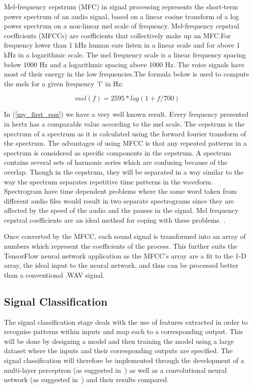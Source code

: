 \documentclass[10pt,twocolumn]{witseiepaper}
\begin{document}
Mel-frequency cepstrum (MFC) in signal processing represents the short-term power spectrum of an audio signal, based on a linear cosine transform of a log power spectrum on a non-linear mel scale of frequency. Mel-frequency cepstral coefficients (MFCCs) are coefficients that collectively make up an MFC.For frequency lower than 1 kHz human ears listen in a linear scale and for above 1 kHz in a logarithmic scale. The mel frequency scale is a linear frequency spacing below 1000 Hz and a logarithmic spacing above 1000 Hz. The voice signals have most of their energy in the low frequencies.The formula below is used to compute the mels for a given frequency 'f' in Hz:

\begin{equation}\label{my_first_eqn}
mel(f)=2595*log(1+f/700)
\end{equation}

In (\ref{my_first_eqn}) we have a very well known result.
Every frequency presented in hertz has a comparable value according to the mel scale. 
The cepstrum is the spectrum of a spectrum as it is calculated using the forward fourier transform of the spectrum. The advantages of using MFCC is that any repeated patterns in a spectrum is considered as specific components in the cepstrum. A spectrum contains several sets of harmonic series which are confusing because of the overlap. Though in the cepstrum, they will be separated in a way similar to the way the spectrum separates repetitive time patterns in the waveform. Spectrogram have time dependent problems where the same word taken from different audio files would result in two separate spectrograms since they are affected by the speed of the audio and the pauses in the signal. Mel frequency cepstral coefficients are an ideal method for coping with these problems. 
\cite{MFCC-3}.

Once converted by the MFCC, each sound signal is transformed into an array of numbers which represent the coefficients of the process. This further suits the TensorFlow neural network application as the MFCC's array are a fit to the 1-D array, the ideal input to the neural network, and thus can be processed better than a conventional .WAV signal.

\subsection{Signal Classification}
The signal classification stage deals with the use of features extracted in order to recognise patterns within inputs and map each to a corresponding output. This will be done by designing a model and then training the model using a large dataset where the inputs and their corresponding outputs are specified. The signal classification will therefore be implemented through the development of a multi-layer perceptron (as suggested in~\cite{fearMLP}) as well as a convolutional neural network (as suggested in~\cite{RGB}) and their results compared. 
\end{document}
